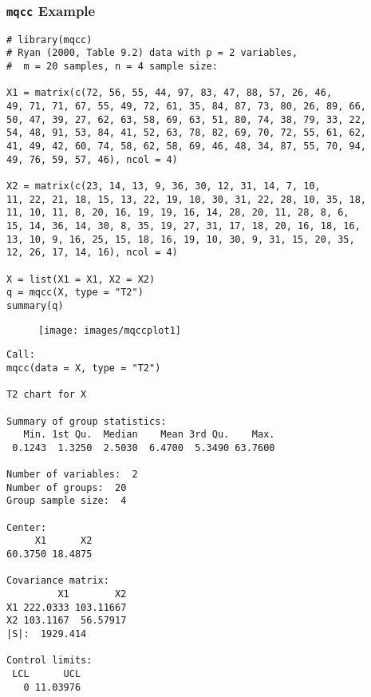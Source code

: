 \documentclass[SPC-MASTER.tex]{subfiles}
\begin{document}
\begin{frame}
\frametitle{\texttt{mqcc} Example}
\begin{framed}
\begin{verbatim}
# library(mqcc)
# Ryan (2000, Table 9.2) data with p = 2 variables, 
#  m = 20 samples, n = 4 sample size:

X1 = matrix(c(72, 56, 55, 44, 97, 83, 47, 88, 57, 26, 46,
49, 71, 71, 67, 55, 49, 72, 61, 35, 84, 87, 73, 80, 26, 89, 66,
50, 47, 39, 27, 62, 63, 58, 69, 63, 51, 80, 74, 38, 79, 33, 22,
54, 48, 91, 53, 84, 41, 52, 63, 78, 82, 69, 70, 72, 55, 61, 62,
41, 49, 42, 60, 74, 58, 62, 58, 69, 46, 48, 34, 87, 55, 70, 94,
49, 76, 59, 57, 46), ncol = 4)

X2 = matrix(c(23, 14, 13, 9, 36, 30, 12, 31, 14, 7, 10,
11, 22, 21, 18, 15, 13, 22, 19, 10, 30, 31, 22, 28, 10, 35, 18,
11, 10, 11, 8, 20, 16, 19, 19, 16, 14, 28, 20, 11, 28, 8, 6,
15, 14, 36, 14, 30, 8, 35, 19, 27, 31, 17, 18, 20, 16, 18, 16,
13, 10, 9, 16, 25, 15, 18, 16, 19, 10, 30, 9, 31, 15, 20, 35,
12, 26, 17, 14, 16), ncol = 4)

X = list(X1 = X1, X2 = X2)
q = mqcc(X, type = "T2")
summary(q)
\end{verbatim}
\end{framed}
\end{frame}
\begin{frame}
\begin{figure}[h!]
\centering
\texttt{[image: images/mqccplot1]}
\caption{}
\label{fig:mqccplot1}
\end{figure}
\end{frame}
\begin{frame}
\begin{verbatim}
Call:
mqcc(data = X, type = "T2")

T2 chart for X 

Summary of group statistics:
   Min. 1st Qu.  Median    Mean 3rd Qu.    Max. 
 0.1243  1.3250  2.5030  6.4700  5.3490 63.7600 

Number of variables:  2
Number of groups:  20
Group sample size:  4

Center: 
     X1      X2 
60.3750 18.4875 

Covariance matrix:
         X1        X2
X1 222.0333 103.11667
X2 103.1167  56.57917
|S|:  1929.414 

Control limits:
 LCL      UCL
   0 11.03976

\end{verbatim}

\end{frame}
\end{document}
